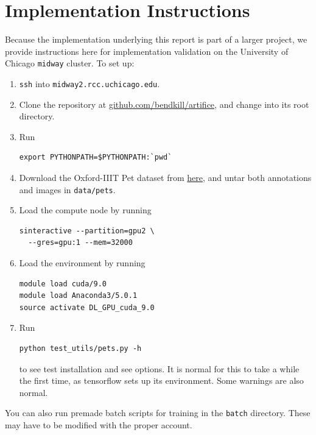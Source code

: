 \documentclass[10pt, journal]{IEEEtran}
\begin{document}



\appendices{}

\section{Implementation Instructions}
\label{sec:impl-instr}

Because the implementation underlying this report is part of a larger project,
we provide instructions here for implementation validation on the University of
Chicago \verb|midway| cluster. To set up:

\begin{enumerate}
\item \verb|ssh| into \verb|midway2.rcc.uchicago.edu|.
\item Clone the repository at
  \href{https://github.com/bendkill/artifice}{github.com/bendkill/artifice}, and
  change into its root directory.
\item Run
\begin{verbatim}
export PYTHONPATH=$PYTHONPATH:`pwd`
\end{verbatim}
\item Download the Oxford-IIIT Pet dataset from
  \href{http://www.robots.ox.ac.uk/~vgg/data/pets/}{here}, and untar both
  annotations and images in \verb|data/pets|.
\item Load the compute node by running
\begin{verbatim}
sinteractive --partition=gpu2 \
  --gres=gpu:1 --mem=32000
\end{verbatim}

\item Load the environment by running
\begin{verbatim}
module load cuda/9.0
module load Anaconda3/5.0.1
source activate DL_GPU_cuda_9.0
\end{verbatim}
\item Run
\begin{verbatim}
python test_utils/pets.py -h
\end{verbatim}
  to see test installation and see options. It is normal for this to take a
  while the first time, as tensorflow sets up its environment. Some warnings are
  also normal.
\end{enumerate}

You can also run premade batch scripts for training in the \verb|batch|
directory. These may have to be modified with the proper account.
\end{document}
